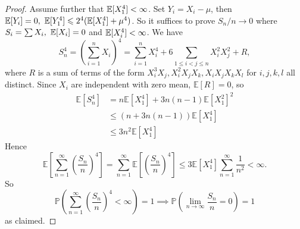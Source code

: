 \begin{proof}
    Assume further that $ {\mathbb{E}}[X_1^4]<\infty $. Set $ Y_i=X_i-\mu $, then $ {\mathbb{E}}[Y_i]=0,\ {\mathbb{E}}[Y_1^4]\leqslant 2^4({\mathbb{E}}[X_1^4]+\mu^4) $. So it suffices to prove $ S_n/n\to 0 $ where $ S_i=\sum X_i,\ {\mathbb{E}}[X_i]=0 $ and $ {\mathbb{E}}[X_i^4]<\infty  $. We have 
    \[
        S_n^4=\left( \sum_{i=1}^nX_i \right)^4=\sum_{i=1}^nX_i^4+6\sum_{1\le i<j\le n}X_i^2X_j^2+R,
    \]
    where $R$ is a sum of terms of the form $X_i^3X_j,X_i^2X_jX_k,X_iX_jX_kX_l$ for $i,j,k,l$ all distinct. Since $X_i$ are independent with zero mean, $\mathbb E[R]=0$, so
    \begin{align*}
        \mathbb E[S_n^4]&=n\mathbb E[X_1^4]+3n(n-1)\mathbb E[X_1^2]^2\\
        &\le (n+3n(n-1))\mathbb E[X_1^4]\\
        &\le 3n^2\mathbb E[X_1^4]
    \end{align*}
    Hence
    $$\mathbb E\left[ \sum_{n=1}^\infty\left( \frac{S_n}{n} \right)^4 \right]=\sum_{n=1}^\infty\mathbb E\left[ \left( \frac{S_n}{n} \right)^4 \right]\le 3\mathbb E[X_1^4]\sum_{n=1}^\infty\frac{1}{n^2}<\infty.$$
    So
    $$\mathbb P\left(\sum_{n=1}^\infty\left( \frac{S_n}{n} \right)^4<\infty\right)=1\implies\mathbb P\left(\lim_{n\to\infty}\frac{S_n}{n}=0\right)=1$$
    as claimed.
\end{proof}
